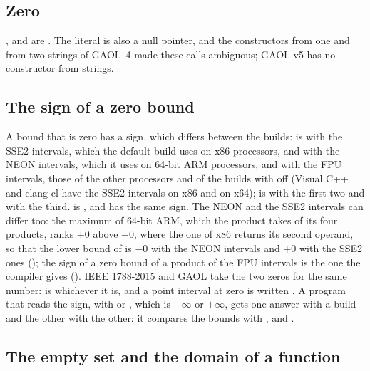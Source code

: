 \subsection{Zero}
%

,  and 
are . The literal  is also a null pointer, and the
constructors from one and from two strings of GAOL~4 made these calls
ambiguous; GAOL v5 has no constructor from strings.\newinvfive

\subsection{The sign of a zero bound}\label{sec:zero-sign}
%

A bound that is zero has a sign, which differs between the builds:
 is  with the SSE2 intervals, which the
default build uses on x86 processors, and with the NEON intervals, which it
uses on 64-bit ARM processors, and  with the FPU intervals, those of
the other processors and of the builds with  off (Visual
C++ and clang-cl have the SSE2 intervals on x86 and on x64);\newinvfive{}  is  with the first
two and  with the third.  is , and has
the same sign.\newinvfive{} The NEON and the SSE2 intervals can differ too:
the maximum of 64-bit ARM, which the product takes of its four products, ranks
$+0$ above $-0$, where the one of x86 returns its second operand, so that the
lower bound of  is $-0$ with the NEON
intervals and $+0$ with the SSE2 ones (); the sign of a zero
bound of a product of the FPU intervals is the one the compiler gives
(). IEEE 1788-2015 and GAOL take the two zeros for
the same number:  is  whichever it is, and a
point interval at zero is written \code{[0]}. A program that reads the sign,
with  or , which is
$-\infty$ or $+\infty$, gets one answer with a build and the other with the
other: it compares the bounds with \code{==}, \code{<} and
\code{<=}.\newinvfive

\subsection{The empty set and the domain of a function}
%
%

